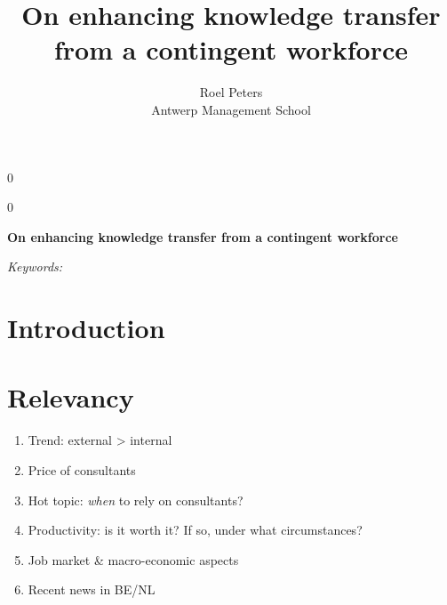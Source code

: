 \documentclass[12pt]{article}
\newcommand{\blind}{0}
\providecommand{\tightlist}{%
  \setlength{\itemsep}{0pt}\setlength{\parskip}{0pt}}
\begin{document}
\def\spacingset#1{\renewcommand{\baselinestretch}%
{#1}\small\normalsize} \spacingset{1}



\blind
{
  \title{\bf On enhancing knowledge transfer from a contingent
workforce}

  \author{
        Roel Peters \\
    Antwerp Management School\\
      }
  \maketitle
} \fi

\blind
{
  \bigskip
  \bigskip
  \bigskip
  \begin{center}
    {\LARGE\bf On enhancing knowledge transfer from a contingent
workforce}
  \end{center}
  \medskip
} \fi

\bigskip
\begin{abstract}

\end{abstract}

\noindent%
{\it Keywords:} 
\vfill

\newpage
\spacingset{1.45} %

\hypertarget{introduction}{%
\section{Introduction}\label{introduction}}

\hypertarget{relevancy}{%
\section{Relevancy}\label{relevancy}}

\begin{enumerate}
\def\labelenumi{\arabic{enumi}.}
\tightlist
\item
  Trend: external \textgreater{} internal
\item
  Price of consultants
\item
  Hot topic: \emph{when} to rely on consultants?
\item
  Productivity: is it worth it? If so, under what circumstances?
\item
  Job market \& macro-economic aspects
\item
  Recent news in BE/NL
\end{enumerate}
\end{document}
